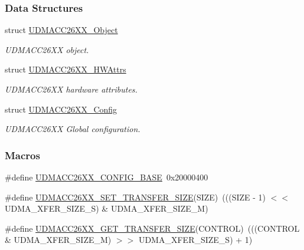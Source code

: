 \subsubsection*{Data Structures}
\begin{DoxyCompactItemize}
\item 
struct \hyperlink{struct_u_d_m_a_c_c26_x_x___object}{U\+D\+M\+A\+C\+C26\+X\+X\+\_\+\+Object}
\begin{DoxyCompactList}\small\item\em U\+D\+M\+A\+C\+C26\+X\+X object. \end{DoxyCompactList}\item 
struct \hyperlink{struct_u_d_m_a_c_c26_x_x___h_w_attrs}{U\+D\+M\+A\+C\+C26\+X\+X\+\_\+\+H\+W\+Attrs}
\begin{DoxyCompactList}\small\item\em U\+D\+M\+A\+C\+C26\+X\+X hardware attributes. \end{DoxyCompactList}\item 
struct \hyperlink{struct_u_d_m_a_c_c26_x_x___config}{U\+D\+M\+A\+C\+C26\+X\+X\+\_\+\+Config}
\begin{DoxyCompactList}\small\item\em U\+D\+M\+A\+C\+C26\+X\+X Global configuration. \end{DoxyCompactList}\end{DoxyCompactItemize}
\subsubsection*{Macros}
\begin{DoxyCompactItemize}
\item 
\#define \hyperlink{_u_d_m_a_c_c26_x_x_8h_ab956c64f89045e5c6546115ec6062a7f}{U\+D\+M\+A\+C\+C26\+X\+X\+\_\+\+C\+O\+N\+F\+I\+G\+\_\+\+B\+A\+S\+E}~0x20000400
\item 
\#define \hyperlink{_u_d_m_a_c_c26_x_x_8h_a5c7843573980a2380bd0adf65f58a433}{U\+D\+M\+A\+C\+C26\+X\+X\+\_\+\+S\+E\+T\+\_\+\+T\+R\+A\+N\+S\+F\+E\+R\+\_\+\+S\+I\+Z\+E}(S\+I\+Z\+E)~(((S\+I\+Z\+E -\/ 1) $<$$<$ U\+D\+M\+A\+\_\+\+X\+F\+E\+R\+\_\+\+S\+I\+Z\+E\+\_\+\+S) \& U\+D\+M\+A\+\_\+\+X\+F\+E\+R\+\_\+\+S\+I\+Z\+E\+\_\+\+M)
\item 
\#define \hyperlink{_u_d_m_a_c_c26_x_x_8h_af51cbac1b7f6cc86b9ea0db72426dade}{U\+D\+M\+A\+C\+C26\+X\+X\+\_\+\+G\+E\+T\+\_\+\+T\+R\+A\+N\+S\+F\+E\+R\+\_\+\+S\+I\+Z\+E}(C\+O\+N\+T\+R\+O\+L)~(((C\+O\+N\+T\+R\+O\+L \& U\+D\+M\+A\+\_\+\+X\+F\+E\+R\+\_\+\+S\+I\+Z\+E\+\_\+\+M) $>$$>$ U\+D\+M\+A\+\_\+\+X\+F\+E\+R\+\_\+\+S\+I\+Z\+E\+\_\+\+S) + 1)
\end{DoxyCompactItemize}
